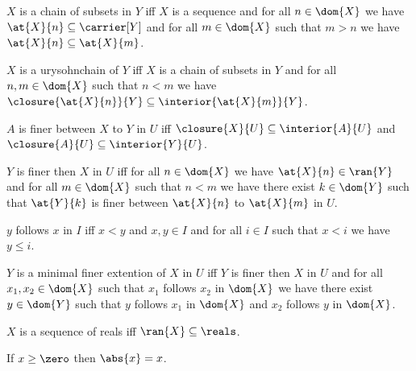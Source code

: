 \begin{definition}\label{chain_of_subsets}
    $X$ is a chain of subsets in $Y$ iff $X$ is a sequence and for all $n \in \dom{X}$ we have $\at{X}{n} \subseteq \carrier[Y]$ and for all $m \in \dom{X}$ such that $m > n$ we have $\at{X}{n} \subseteq \at{X}{m}$. 
\end{definition}


\begin{definition}\label{urysohnchain}%
    $X$ is a urysohnchain of $Y$ iff $X$ is a chain of subsets in $Y$ and for all $n,m \in \dom{X}$ such that $n < m$ we have $\closure{\at{X}{n}}{Y} \subseteq \interior{\at{X}{m}}{Y}$.
\end{definition}

\begin{definition}\label{urysohn_finer_set}
    $A$ is finer between $X$ to $Y$ in $U$ iff $\closure{X}{U} \subseteq \interior{A}{U}$ and $\closure{A}{U} \subseteq \interior{Y}{U}$.
\end{definition}

\begin{definition}\label{finer} %
    $Y$ is finer then $X$ in $U$ iff for all $n \in \dom{X}$ we have $\at{X}{n} \in \ran{Y}$ and for all $m \in \dom{X}$ such that $n < m$ we have there exist $k \in \dom{Y}$ such that $\at{Y}{k}$ is finer between $\at{X}{n}$ to $\at{X}{m}$ in $U$.
\end{definition}

\begin{definition}\label{follower_index}
    $y$ follows $x$ in $I$ iff $x < y$ and $x,y \in I$ and for all $i \in I$ such that $x < i$ we have $y \leq i$.
\end{definition}

\begin{definition}\label{finer_smallest_step}
    $Y$ is a minimal finer extention of $X$ in $U$ iff $Y$ is finer then $X$ in $U$ and for all $x_1,x_2 \in \dom{X}$ such that $x_1$ follows $x_2$ in $\dom{X}$ we have there exist $y \in \dom{Y}$ such that $y$ follows $x_1$ in $\dom{X}$ and $x_2$ follows $y$ in $\dom{X}$.
\end{definition}

\begin{definition}\label{sequence_of_reals}
    $X$ is a sequence of reals iff $\ran{X} \subseteq \reals$.
\end{definition}


\begin{axiom}\label{abs_behavior1}
    If $x \geq \zero$ then $\abs{x} = x$.
\end{axiom}

